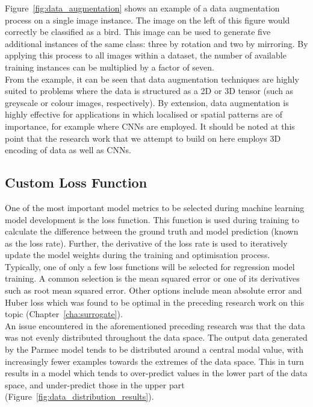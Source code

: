 \noindent
Figure~\ref{fig:data_augmentation} shows an example of a data augmentation process on a single image instance. The image on the left of this figure would correctly be classified as a bird. This image can be used to generate five additional instances of the same class: three by rotation and two by mirroring. By applying this process to all images within a dataset, the number of available training instances can be multiplied by a factor of seven.
\\

\noindent
From the example, it can be seen that data augmentation techniques are highly suited to problems where the data is structured as a 2D or 3D tensor (such as greyscale or colour images, respectively). By extension, data augmentation is highly effective for applications in which localised or spatial patterns are of importance, for example where CNNs are employed. It should be noted at this point that the research work that we attempt to build on here employs 3D encoding of data as well as CNNs. 


\subsection{Custom Loss Function} \label{LossFunction}

One of the most important model metrics to be selected during machine learning model development is the loss function. This function is used during training to calculate the difference between the ground truth and model prediction (known as the loss rate). Further, the derivative of the loss rate is used to iteratively update the model weights during the training and optimisation process.  
\\

\noindent
Typically, one of only a few loss functions will be selected for regression model training. A common selection is the mean squared error \cite{wallach1989mean} or one of its derivatives such as root mean squared error. Other options include mean absolute error \cite{chai2014root} and Huber loss \cite{huber1964robust} which was found to be optimal in the preceding research work on this topic (Chapter~\ref{cha:surrogate}).  
\\

\noindent
An issue encountered in the aforementioned preceding research was that the data was not evenly distributed throughout the data space. The output data generated by the Parmec model tends to be distributed around a central modal value, with increasingly fewer examples towards the extremes of the data space. This in turn results in a model which tends to over-predict values in the lower part of the data space, and under-predict those in the upper part (Figure~\ref{fig:data_distribution_results}).
\\

